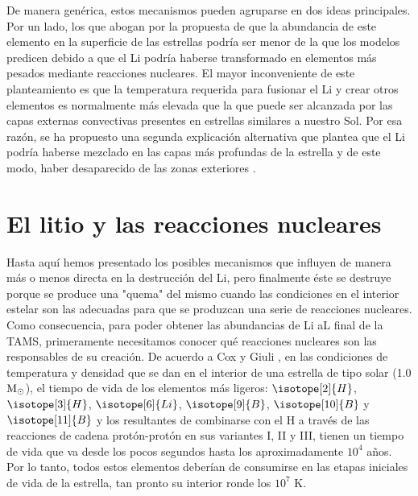 De manera genérica, estos mecanismos pueden agruparse en dos ideas principales. Por un lado, los que abogan por la propuesta de que la abundancia de este elemento en la superficie de las estrellas podría ser menor de la que los modelos predicen debido a que el Li podría haberse transformado en elementos más pesados mediante reacciones nucleares. El mayor inconveniente de este planteamiento es que la temperatura requerida para fusionar el Li y crear otros elementos es normalmente más elevada que la que puede ser alcanzada por las capas externas convectivas presentes en estrellas similares a nuestro Sol. Por esa razón, se ha propuesto una segunda explicación alternativa que plantea que el Li podría haberse mezclado en las capas más profundas de la estrella y de este modo, haber desaparecido de las zonas exteriores \cite{Pinsonneault1997}.\par



\section{El litio y las reacciones nucleares} \label{sec:li_reac_nuc}
Hasta aquí hemos presentado los posibles mecanismos que influyen de manera más o menos directa en la destrucción del Li, pero finalmente éste se destruye porque se produce una "quema" del mismo cuando las condiciones en el interior estelar son las adecuadas para que se produzcan una serie de reacciones nucleares. Como consecuencia, para poder obtener las abundancias de Li aL final de la TAMS, primeramente necesitamos conocer qué reacciones nucleares son las responsables de su creación. De acuerdo a Cox y Giuli \cite{Cox1968}, en las condiciones de temperatura y densidad que se dan en el interior de una estrella de tipo solar (1.0 $\mathrm{M}_\odot$), el tiempo de vida de los elementos más ligeros: $\isotope[2]{H}$, $\isotope[3]{H}$, $\isotope[6]{Li}$, $\isotope[9]{B}$, $\isotope[10]{B}$ y $\isotope[11]{B}$ y los resultantes de combinarse con el H a través de las reacciones de cadena protón-protón en sus variantes I, II y III, tienen un tiempo de vida que va desde los pocos segundos hasta los aproximadamente $10^4$ años. Por lo tanto, todos estos elementos deberían de consumirse en las etapas iniciales de vida de la estrella, tan pronto su interior ronde los $10^7$ K.\par

